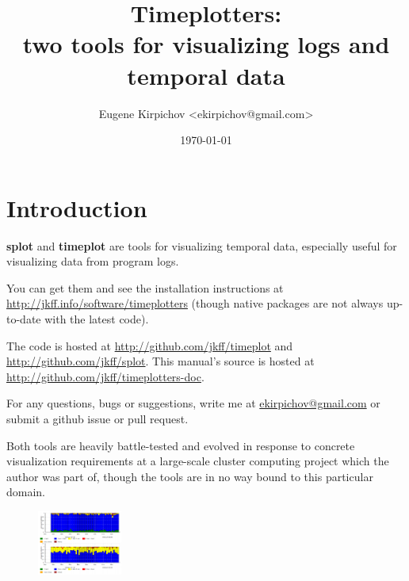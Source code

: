 \documentclass{article}
\begin{document}
\title{Timeplotters:\\
two tools for visualizing logs and temporal data}
\author{Eugene Kirpichov <ekirpichov@gmail.com>}
\date{\today}
\maketitle

\tableofcontents


\def\splot{\textbf{splot}}
\def\timeplot{\textbf{timeplot}}
\def\awk{\textbf{awk}}

\newcommand{\thumbnail}[1]{\texttt{[image: \#1]}}

\newcommand{\inlinethumbnail}[1]{\framebox{$\vcenter{\hbox{\texttt{[image: \#1]}}}$}}

\newcommand{\hlverb}[1]{\texthl{\texttt{#1}}}

\setlength{\parskip}{2mm plus1mm minus1mm}


\pagebreak
\section{Introduction}

\splot{} and \timeplot{} are tools for visualizing temporal data, especially useful for visualizing data from program logs.

You can get them and see the installation instructions at \url{http://jkff.info/software/timeplotters} (though native packages are not always up-to-date with the latest code). 

The code is hosted at \url{http://github.com/jkff/timeplot} and \url{http://github.com/jkff/splot}. This manual's source is hosted at \url{http://github.com/jkff/timeplotters-doc}.

For any questions, bugs or suggestions, write me at \url{ekirpichov@gmail.com} or submit a github issue or pull request. 

Both tools are heavily battle-tested and evolved in response to concrete visualization requirements at a large-scale cluster computing project which the author was part of, though the tools are in no way bound to this particular domain.

\begin{figure}
\vspace{-25pt}
\center
\includegraphics[height=60pt]{pics/tplot/tplot-motivating-example.png}
\end{figure}
  
\end{document}
